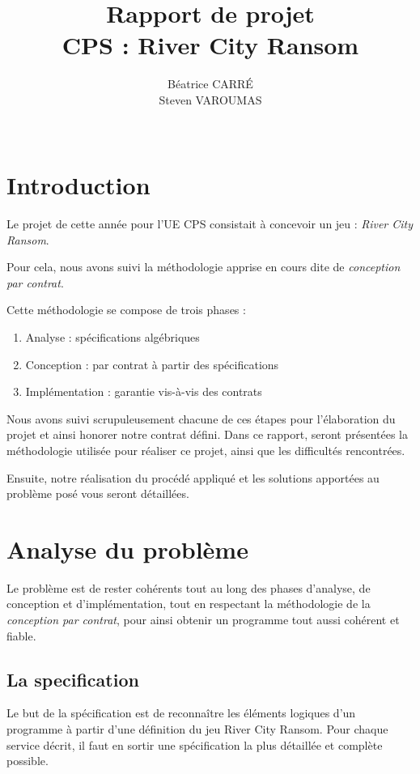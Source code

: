 \documentclass[a4paper, 11pt, notitlepage]{article}
\title{
  \huge Rapport de projet \\
  \huge CPS : River City Ransom\\
}
\author{
  Béatrice CARR\'E \\
  Steven VAROUMAS \\
  \\
}
\begin{document}
\maketitle
\section*{Introduction}


Le projet de cette année pour l'UE CPS  consistait à concevoir un jeu : \emph{River City Ransom}.

Pour cela, nous avons suivi la méthodologie apprise en cours dite de \emph{conception par contrat}.

Cette méthodologie se compose de trois phases :
\begin{enumerate}
\item Analyse : spécifications algébriques 
\item Conception : par contrat à partir des spécifications
\item Implémentation : garantie vis-à-vis des contrats
\end{enumerate}
Nous avons suivi scrupuleusement chacune de ces étapes pour l'élaboration du
projet et ainsi honorer notre contrat défini. 
Dans ce rapport, seront présentées la méthodologie utilisée pour
réaliser ce projet, ainsi que les difficultés rencontrées.
 
Ensuite, notre réalisation du procédé appliqué
et les solutions apportées au problème posé vous seront détaillées.







\section{Analyse du problème}

Le problème est de rester cohérents tout au long des phases d'analyse,
de conception et d'implémentation, tout en respectant la méthodologie de la \emph{conception par contrat},
pour ainsi obtenir un programme tout aussi cohérent et fiable.

\subsection{La specification}
Le but de la spécification est de reconnaître les éléments logiques
d’un programme à partir d’une définition du jeu River City Ransom.
Pour chaque service décrit, il faut en sortir une spécification la
plus détaillée et complète possible.
\end{document}
